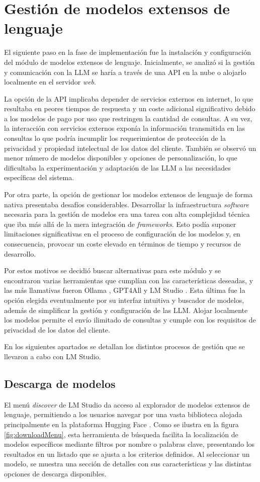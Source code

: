 \section{Gestión de modelos extensos de lenguaje}
El siguiente paso en la fase de implementación fue la instalación
y configuración del módulo de modelos extensos de lenguaje.
Inicialmente, se analizó si la gestión y comunicación con la LLM se haría a través de una
API en la nube o alojarlo localmente en el servidor \textit{web}.

La opción de la API implicaba depender de servicios externos
en internet, lo que resultaba en peores tiempos de respuesta y un coste adicional significativo
debido a los modelos de pago por uso que restringen la cantidad de consultas.
A su vez, la interacción con servicios externos exponía la información transmitida en las consultas
lo que podría incumplir los requerimientos de protección de la privacidad
y propiedad intelectual de los datos del cliente.
También se observó un menor número de modelos disponibles y opciones de personalización,
lo que dificultaba la experimentación y adaptación de las LLM a las necesidades específicas del sistema.

Por otra parte, la opción de gestionar los modelos extensos de lenguaje
de forma nativa presentaba desafíos considerables.
Desarrollar la infraestructura \textit{software} necesaria para la gestión de modelos
era una tarea con alta complejidad técnica que iba más allá de la mera integración de \textit{frameworks}.
Esto podía suponer limitaciones significativas en el proceso de configuración de los modelos y,
en consecuencia, provocar un coste elevado en términos de tiempo y recursos de desarrollo.

Por estos motivos se decidió buscar alternativas para este módulo y se encontraron varias herramientas que
cumplían con las características deseadas, y las más llamativas fueron
Ollama \cite{ollama}, GPT4All \cite{gpt4all} y LM Studio \cite{lmstudio}.
Esta última fue la opción elegida eventualmente por su interfaz intuitiva y buscador de modelos,
además de simplificar la gestión y configuración de las LLM.
Alojar localmente los modelos permite el envío ilimitado de consultas
y cumple con los requisitos de privacidad de los datos del cliente.

En los siguientes apartados se detallan los distintos procesos de gestión que se llevaron a cabo con LM Studio.

\subsection{Descarga de modelos}
El menú \textit{discover} de LM Studio da acceso al explorador de modelos extensos de lenguaje,
permitiendo a los usuarios navegar por una vasta biblioteca alojada principalmente en la plataforma Hugging Face \cite{huggingface}.
Como se ilustra en la figura \ref{fig:downloadMenu},
esta herramienta de búsqueda facilita la localización de modelos específicos mediante filtros por nombre o palabras clave,
presentando los resultados en un listado que se ajusta a los criterios definidos.
Al seleccionar un modelo, se muestra una sección de detalles con sus características y las distintas opciones de descarga disponibles.

